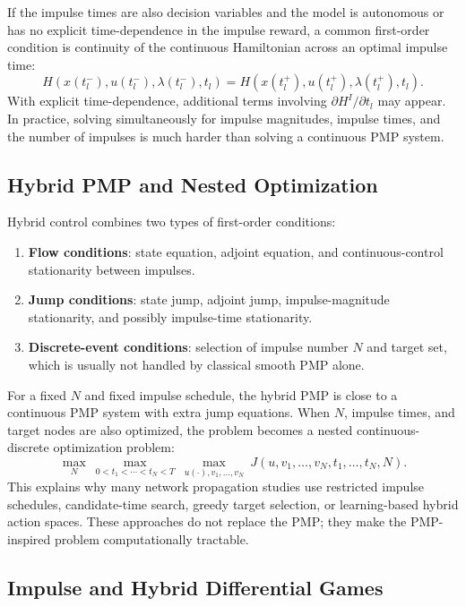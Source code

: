 \documentclass[11pt,a4paper]{article}
\begin{document}
If the impulse times are also decision variables and the model is autonomous or has no explicit time-dependence in the impulse reward, a common first-order condition is continuity of the continuous Hamiltonian across an optimal impulse time:
\begin{equation}
  H(x(t_l^-),u(t_l^-),\lambda(t_l^-),t_l)
  =H(x(t_l^+),u(t_l^+),\lambda(t_l^+),t_l).
  \label{eq:ham-continuity}
\end{equation}
With explicit time-dependence, additional terms involving $\partial H^I/\partial t_l$ may appear. In practice, solving simultaneously for impulse magnitudes, impulse times, and the number of impulses is much harder than solving a continuous PMP system.

\subsection{Hybrid PMP and Nested Optimization}

Hybrid control combines two types of first-order conditions:
\begin{enumerate}
  \item \textbf{Flow conditions}: state equation, adjoint equation, and continuous-control stationarity between impulses.
  \item \textbf{Jump conditions}: state jump, adjoint jump, impulse-magnitude stationarity, and possibly impulse-time stationarity.
  \item \textbf{Discrete-event conditions}: selection of impulse number $N$ and target set, which is usually not handled by classical smooth PMP alone.
\end{enumerate}
For a fixed $N$ and fixed impulse schedule, the hybrid PMP is close to a continuous PMP system with extra jump equations. When $N$, impulse times, and target nodes are also optimized, the problem becomes a nested continuous-discrete optimization problem:
\begin{equation}
  \max_N\ \max_{0<t_1<\cdots<t_N<T}\ \max_{u(\cdot),v_1,\dots,v_N}\ J(u,v_1,\dots,v_N,t_1,\dots,t_N,N).
\end{equation}
This explains why many network propagation studies use restricted impulse schedules, candidate-time search, greedy target selection, or learning-based hybrid action spaces. These approaches do not replace the PMP; they make the PMP-inspired problem computationally tractable.

\subsection{Impulse and Hybrid Differential Games}
\end{document}
